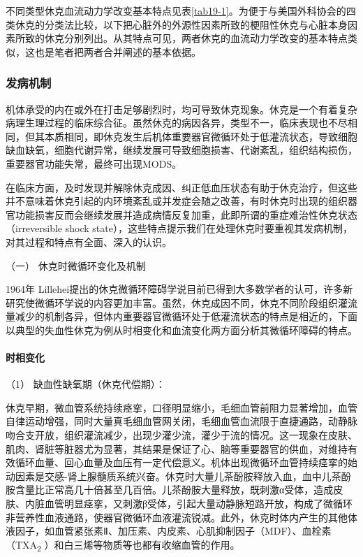 不同类型休克血流动力学改变基本特点见表\ref{tab19-1}。为便于与美国外科协会的四类休克的分类法比较，以下把心脏外的外源性因素所致的梗阻性休克与心脏本身因素所致的休克分别列出。从其特点可见，两者休克的血流动力学改变的基本特点类似，这也是笔者把两者合并阐述的基本依据。

\subsubsection{发病机制}

机体承受的内在或外在打击足够剧烈时，均可导致休克现象。休克是一个有着复杂病理生理过程的临床综合征。虽然休克的病因各异，类型不一，临床表现也不尽相同，但其本质相同，即休克发生后机体重要器官微循环处于低灌流状态，导致细胞缺血缺氧，细胞代谢异常，继续发展可导致细胞损害、代谢紊乱，组织结构损伤，重要器官功能失常，最终可出现MODS。

在临床方面，及时发现并解除休克成因、纠正低血压状态有助于休克治疗，但这些并不意味着休克引起的内环境紊乱或并发症会随之改善，有时休克时出现的组织器官功能损害反而会继续发展并造成病情反复加重，此即所谓的重症难治性休克状态（irreversible
shock
state），这些特点提示我们在处理休克时要重视其发病机制，对其过程和特点有全面、深入的认识。

\hypertarget{text00055.htmlux5cux23CHP2-1-1-2-1}{}
（一） 休克时微循环变化及机制

1964年
Lillehei提出的休克微循环障碍学说目前已得到大多数学者的认可，许多新研究使微循环学说的内容更加丰富。虽然，休克成因不同，休克不同阶段组织灌流量减少的机制各异，但体内重要器官微循环处于低灌流状态的特点是相近的，下面以典型的失血性休克为例从时相变化和血流变化两方面分析其微循环障碍的特点。

\paragraph{时相变化}

\hypertarget{text00055.htmlux5cux23CHP2-1-1-2-1-1-1}{}
（1） 缺血性缺氧期（休克代偿期）：

休克早期，微血管系统持续痉挛，口径明显缩小，毛细血管前阻力显著增加，血管自律运动增强，同时大量真毛细血管网关闭，毛细血管血流限于直捷通路，动静脉吻合支开放，组织灌流减少，出现少灌少流，灌少于流的情况。这一现象在皮肤、肌肉、肾脏等脏器尤为显著，其结果是保证了心、脑等重要器官的供血，对维持有效循环血量、回心血量及血压有一定代偿意义。机体出现微循环血管持续痉挛的始动因素是交感-肾上腺髓质系统兴奋。休克时大量儿茶酚胺释放入血，血中儿茶酚胺含量比正常高几十倍甚至几百倍。儿茶酚胺大量释放，既刺激α受体，造成皮肤、内脏血管明显痉挛，又刺激β受体，引起大量动静脉短路开放，构成了微循环非营养性血液通路，使器官微循环血液灌流锐减。此外，休克时体内产生的其他体液因子，如血管紧张素Ⅱ、加压素、内皮素、心肌抑制因子（MDF）、血栓素（TXA\textsubscript{2}
）和白三烯等物质等也都有收缩血管的作用。


